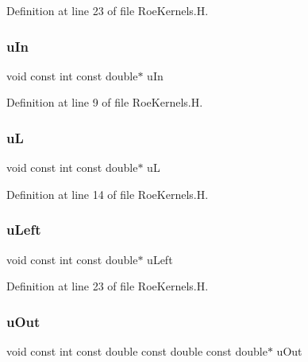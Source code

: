 Definition at line 23 of file Roe\+Kernels.\+H.

\hypertarget{RoeKernels_8H_a1b97e89ad96c3195da39163d30857767}{}\label{RoeKernels_8H_a1b97e89ad96c3195da39163d30857767} 
\subsubsection{\texorpdfstring{u\+In}{uIn}}
{\footnotesize\ttfamily void const int const double$\ast$ u\+In}



Definition at line 9 of file Roe\+Kernels.\+H.

\hypertarget{RoeKernels_8H_a9dfc587f7fe16adaf8968f62e62ea6a7}{}\label{RoeKernels_8H_a9dfc587f7fe16adaf8968f62e62ea6a7} 
\subsubsection{\texorpdfstring{uL}{uL}}
{\footnotesize\ttfamily void const int const double$\ast$ uL}



Definition at line 14 of file Roe\+Kernels.\+H.

\hypertarget{RoeKernels_8H_a6d30a232f8df207a0a3655c728f0c396}{}\label{RoeKernels_8H_a6d30a232f8df207a0a3655c728f0c396} 
\subsubsection{\texorpdfstring{u\+Left}{uLeft}}
{\footnotesize\ttfamily void const int const double$\ast$ u\+Left}



Definition at line 23 of file Roe\+Kernels.\+H.

\hypertarget{RoeKernels_8H_aa8ba2167c968e6f2da632acd106b7f88}{}\label{RoeKernels_8H_aa8ba2167c968e6f2da632acd106b7f88} 
\subsubsection{\texorpdfstring{u\+Out}{uOut}}
{\footnotesize\ttfamily void const int const double const double const double$\ast$ u\+Out}



